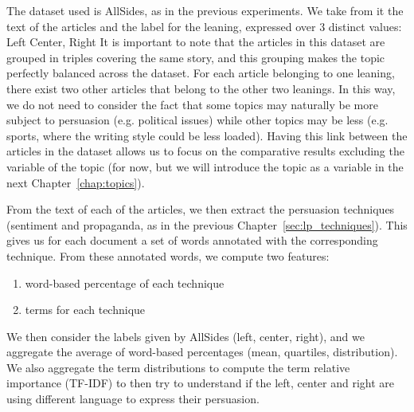 The dataset used is AllSides, as in the previous experiments.
We take from it the text of the articles and the label for the leaning, expressed over 3 distinct values: Left Center, Right
It is important to note that the articles in this dataset are grouped in triples covering the same story, and this grouping makes the topic perfectly balanced across the dataset. For each article belonging to one leaning, there exist two other articles that belong to the other two leanings.
In this way, we do not need to consider the fact that some topics may naturally be more subject to persuasion (e.g. political issues) while other topics may be less (e.g. sports, where the writing style could be less loaded).
Having this link between the articles in the dataset allows us to focus on the comparative results excluding the variable of the topic (for now, but we will introduce the topic as a variable in the next Chapter~\ref{chap:topics}).

From the text of each of the articles, we then extract the persuasion techniques (sentiment and propaganda, as in the previous Chapter~\ref{sec:lp_techniques}). This gives us for each document a set of words annotated with the corresponding technique. From these annotated words, we compute two features:
\begin{enumerate}
    \item word-based percentage of each technique
    \item terms for each technique
\end{enumerate}



We then consider the labels given by AllSides (left, center, right), and we aggregate the average of word-based percentages (mean, quartiles, distribution). %
We also aggregate the term distributions to compute the term relative importance (TF-IDF) to then try to understand if the left, center and right are using different language to express their persuasion.

